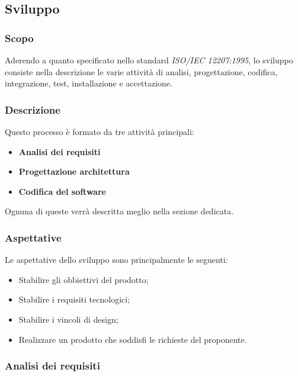 \documentclass[../norme-di-progetto.tex]{subfiles}
\begin{document}
\subsection{Sviluppo}

\subsubsection{Scopo}
Aderendo a quanto specificato nello standard \emph{ISO/IEC  12207:1995}, lo sviluppo consiste nella descrizione le varie attività di analisi, progettazione, codifica, integrazione, test, installazione e accettazione.

\subsubsection{Descrizione}

Questo processo è formato da tre attività principali:
\begin{itemize}
    \item \textbf{Analisi dei requisiti}
    \item \textbf{Progettazione architettura}
    \item \textbf{Codifica del software}
\end{itemize}

Ognuna di queste verrà descritta meglio nella sezione dedicata.

\subsubsection{Aspettative}
Le aspettative dello sviluppo sono principalmente le seguenti:
\begin{itemize}

\item Stabilire gli obbiettivi del prodotto;
\item Stabilire i requisiti tecnologici;
\item Stabilire i vincoli di design;
\item Realizzare un prodotto che soddisfi le richieste del proponente.

\end{itemize}

\subsubsection{Analisi dei requisiti}
\end{document}
